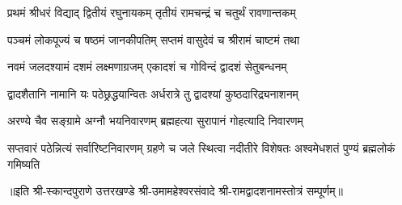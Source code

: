 

\twolineshloka
{प्रथमं श्रीधरं विद्याद् द्वितीयं रघुनायकम्}
{तृतीयं रामचन्द्रं च चतुर्थं रावणान्तकम्}

\twolineshloka
{पञ्चमं लोकपूज्यं च षष्ठमं जानकीपतिम्}
{सप्तमं वासुदेवं च श्रीरामं चाष्टमं तथा}

\twolineshloka
{नवमं जलदश्यामं दशमं लक्ष्मणाग्रजम्}
{एकादशं च गोविन्दं द्वादशं सेतुबन्धनम्}

\twolineshloka
{द्वादशैतानि नामानि यः पठेछ्रद्धयान्वितः}
{अर्धरात्रे तु द्वादश्यां कुष्ठदारिद्र्यनाशनम्}

\twolineshloka
{अरण्ये चैव सङ्ग्रामे अग्नौ भयनिवारणम्}
{ब्रह्महत्या सुरापानं गोहत्यादि निवारणम्}

\threelineshloka
{सप्तवारं पठेन्नित्यं सर्वारिष्टनिवारणम्}
{ग्रहणे च जले स्थित्वा नदीतीरे विशेषतः}
{अश्वमेधशतं पुण्यं ब्रह्मलोकं गमिष्यति}

॥इति श्री-स्कान्दपुराणे उत्तरखण्डे श्री-उमामहेश्वरसंवादे श्री-रामद्वादशनामस्तोत्रं सम्पूर्णम्॥